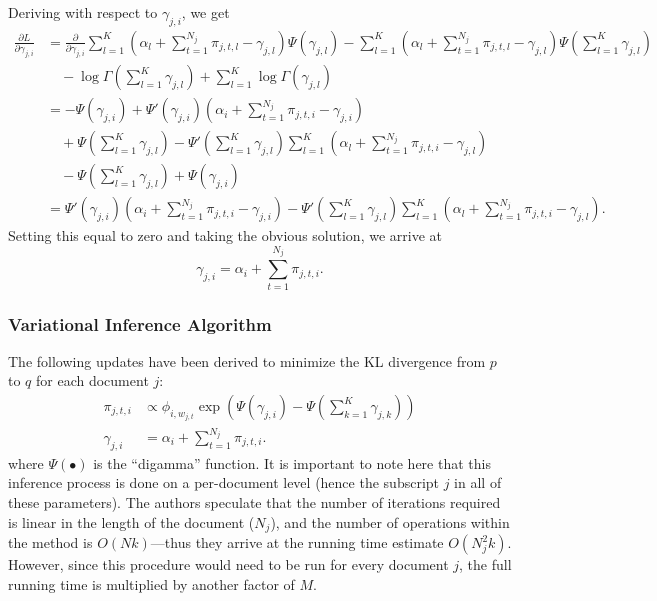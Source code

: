 \documentclass[11pt]{article}
\begin{document}
Deriving with respect to $\gamma_{j,i}$, we get
\begin{align*}
  \frac{\partial L}{\partial \gamma_{j,i}}
  &=
  \frac{\partial}{\partial \gamma_{j,i}}
  \sum_{l=1}^K \left(\alpha_l + \sum_{t=1}^{N_j} \pi_{j,t,l} -
    \gamma_{j,l}\right)
  \Psi(\gamma_{j,l})
  -
  \sum_{l=1}^K \left(\alpha_l + \sum_{t=1}^{N_j} \pi_{j,t,l} -
    \gamma_{j,l}\right)
  \Psi(\sum_{l=1}^K \gamma_{j,l})
  \\&\quad-
  \log \Gamma\left(\sum_{l=1}^K \gamma_{j,l}\right)
  +
  \sum_{l=1}^K \log \Gamma\left(\gamma_{j,l}\right)
  \\&=
  -\Psi(\gamma_{j,i}) + \Psi'(\gamma_{j,i})\left(\alpha_i + \sum_{t=1}^{N_j}
  \pi_{j,t,i} - \gamma_{j,i}\right)
  \\&\quad+
  \Psi\left(\sum_{l=1}^K \gamma_{j,l}\right)
  - \Psi'\left(\sum_{l=1}^K \gamma_{j,l}\right)\sum_{l=1}^K \left(
    \alpha_l + \sum_{t=1}^{N_j} \pi_{j,t,i} - \gamma_{j,l}
  \right)
  \\&\quad-
  \Psi\left(\sum_{l=1}^K \gamma_{j,l} \right)
  + \Psi(\gamma_{j,i})
  \\&=
  \Psi'(\gamma_{j,i})\left(
    \alpha_i + \sum_{t=1}^{N_j} \pi_{j,t,i} - \gamma_{j,i}
  \right)
  - \Psi'\left(\sum_{l=1}^K \gamma_{j,l}\right)\sum_{l=1}^K \left(
    \alpha_l + \sum_{t=1}^{N_j} \pi_{j,t,i} - \gamma_{j,l}
  \right).
\end{align*}
Setting this equal to zero and taking the obvious solution, we arrive at
\begin{equation}
  \gamma_{j,i} = \alpha_i + \sum_{t=1}^{N_j} \pi_{j,t,i}.
\end{equation}

\subsubsection{Variational Inference Algorithm}
\label{sec:var-inf-alg}

The following updates have been derived to minimize the KL divergence from
$p$ to $q$ for each document $j$:
\begin{align}
  \pi_{j,t,i} &\propto \phi_{i,w_{j,t}} \exp\left(\Psi(\gamma_{j,i}) -
  \Psi\left(\sum_{k=1}^K \gamma_{j,k}\right)\right)\\
  \gamma_{j,i} &= \alpha_i + \sum_{t=1}^{N_j} \pi_{j,t,i}.
\end{align}
where $\Psi(\bullet)$ is the ``digamma'' function. It is important to note
here that this inference process is done on a per-document level (hence the
subscript $j$ in all of these parameters). The authors speculate that the
number of iterations required is linear in the length of the document
($N_j$), and the number of operations within the method is $O(Nk)$---thus
they arrive at the running time estimate $O(N_j^2 k)$. However, since this
procedure would need to be run for every document $j$, the full running
time is multiplied by another factor of $M$.
\end{document}

